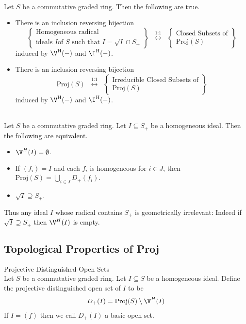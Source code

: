 \documentclass[a4paper]{article}
\begin{document}
\begin{prp}{}{}\\
Let $S$ be a commutative graded ring. Then the following are true. 
\begin{itemize}
\item There is an inclusion reversing bijection $$\left\{\substack{\text{Homogeneous radical}\\\text{ideals }I\text {of }S\text{ such that }I=\sqrt{I}\cap S_+}\right\}\;\;\overset{\text{1:1}}{\longleftrightarrow}\;\;\left\{\substack{\text{Closed Subsets of}\\\text{Proj}(S)}\right\}$$ induced by $\V^\text{H}(-)$ and $\I^\text{H}(-)$. 
\item There is an inclusion reversing bijection $$\text{Proj}(S)\;\;\overset{\text{1:1}}{\longleftrightarrow}\;\;\left\{\substack{\text{Irreducible Closed Subsets of}\\\text{Proj}(S)}\right\}$$ induced by $\V^\text{H}(-)$ and $\I^\text{H}(-)$. 
\end{itemize}
\end{prp}

\begin{lmm}{}{}\\
Let $S$ be a commutative graded ring. Let $I\subseteq S_+$ be a homogeneous ideal. Then the following are equivalent. 
\begin{itemize}
\item $\V^H(I)=\emptyset$. 
\item If $(f_i)=I$ and each $f_i$ is homogeneous for $i\in J$, then $\text{Proj}(S)=\bigcup_{i\in J}D_+(f_i)$. 
\item $\sqrt{I}\supseteq S_+$. 
\end{itemize}
\end{lmm}

Thus any ideal $I$ whose radical contains $S_+$ is geometrically irrelevant: Indeed if $\sqrt{I}\supseteq S_+$ then $\V^H(I)$ is empty. 

\subsection{Topological Properties of Proj}
\begin{defn}{Projective Distinguished Open Sets}{}\\
Let $S$ be a commutative graded ring. Let $I\subseteq S$ be a homogeneous ideal. Define the projective distinguished open set of $I$ to be $$D_+(I)=\text{Proj}(S)\setminus\V^H(I)$$ If $I=(f)$ then we call $D_+(I)$ a basic open set. 
\end{defn}
\end{document}

